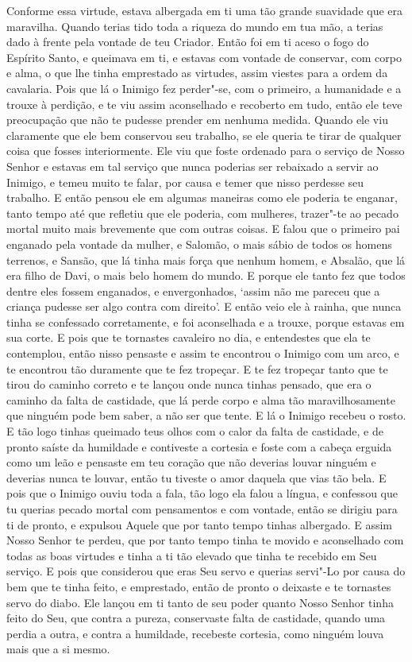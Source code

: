 Conforme essa virtude, estava albergada em ti uma tão grande suavidade que
era maravilha. Quando terias tido toda a riqueza do mundo em tua mão, a terias
dado à frente pela vontade de teu Criador. Então foi em ti aceso o fogo do
Espírito Santo, e queimava em ti, e estavas com vontade de conservar, com corpo
e alma, o que lhe tinha emprestado as virtudes, assim viestes para a ordem da
cavalaria. Pois que lá o Inimigo fez perder"-se, com o primeiro, a humanidade e
a trouxe à perdição, e te viu assim aconselhado e recoberto em tudo, então ele
teve preocupação que não te pudesse prender em nenhuma medida. Quando ele viu
claramente que ele bem conservou seu trabalho, se ele queria te tirar de
qualquer coisa que fosses interiormente. Ele viu que foste ordenado para o
serviço de Nosso Senhor e estavas em tal serviço que nunca poderias ser
rebaixado a servir ao Inimigo, e temeu muito te falar, por causa e temer que
nisso perdesse seu trabalho. E então pensou ele em algumas maneiras como ele
poderia te enganar, tanto tempo até que refletiu que ele poderia, com mulheres,
trazer"-te ao pecado mortal muito mais brevemente que com outras coisas. E falou
que o primeiro pai enganado pela vontade da mulher, e Salomão, o mais sábio de
todos os homens terrenos, e Sansão, que lá tinha mais força que nenhum homem, e
Absalão, que lá era filho de Davi, o mais belo homem do mundo. E porque ele
tanto fez que todos dentre eles fossem enganados, e envergonhados, ‘assim não
me pareceu que a criança pudesse ser algo contra com direito’. E então veio ele
à rainha, que nunca tinha se confessado corretamente, e foi aconselhada e a
trouxe, porque estavas em sua corte. E pois que te tornastes
cavaleiro no dia, e entendestes que ela te contemplou, então nisso pensaste e
assim te encontrou o Inimigo com um arco, e te encontrou tão duramente que te
fez tropeçar. E te fez tropeçar tanto que te tirou do caminho correto e te
lançou onde nunca tinhas pensado, que era o caminho da falta de castidade, que
lá perde corpo e alma tão maravilhosamente que ninguém pode bem saber, a não
ser que tente. E lá o Inimigo recebeu o rosto. E tão logo tinhas queimado teus
olhos com o calor da falta de castidade, e de pronto saíste da humildade e
contiveste a cortesia e foste com a cabeça erguida como um leão e pensaste em
teu coração que não deverias louvar ninguém e deverias nunca te louvar, então
tu tiveste o amor daquela que vias tão bela. E pois que o
Inimigo ouviu toda a fala, tão logo ela falou a língua, e confessou que tu
querias pecado mortal com pensamentos e com vontade, então se dirigiu para ti
de pronto, e expulsou Aquele que por tanto tempo tinhas albergado. E assim
Nosso Senhor te perdeu, que por tanto tempo tinha te movido e aconselhado com
todas as boas virtudes e tinha a ti tão elevado que tinha te recebido em Seu
serviço. E pois que considerou que eras Seu servo e querias servi"-Lo por causa
do bem que te tinha feito, e emprestado, então de pronto o deixaste e te
tornastes servo do diabo. Ele lançou em ti tanto de seu poder quanto Nosso
Senhor tinha feito do Seu, que contra a pureza, conservaste falta de castidade,
quando uma perdia a outra, e contra a humildade, recebeste cortesia, como
ninguém louva mais que a si mesmo.


